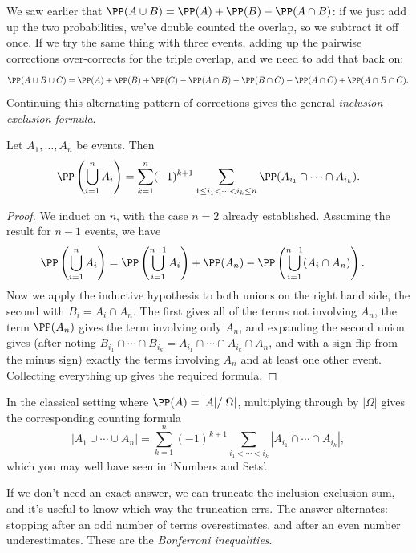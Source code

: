 We saw earlier that $\PP(A \cup B) = \PP(A) + \PP(B) - \PP(A \cap B)$: if we just add up the two probabilities, we've double counted the overlap, so we subtract it off once. If we try the same thing with three events, adding up the pairwise corrections over-corrects for the triple overlap, and we need to add that back on:
$$
\PP(A \cup B \cup C) = \PP(A) + \PP(B) + \PP(C) - \PP(A \cap B) - \PP(B \cap C) - \PP(A \cap C) + \PP(A \cap B \cap C).
$$
Continuing this alternating pattern of corrections gives the general \emph{inclusion-exclusion formula}.

\begin{theorem}
	Let $A_1, \dots, A_n$ be events. Then
	$$
	\PP\left(\bigcup_{i = 1}^{n} A_i\right) = \sum_{k = 1}^{n} (-1)^{k + 1} \sum_{1 \leq i_1 < \cdots < i_k \leq n} \PP(A_{i_1} \cap \cdots \cap A_{i_k}).
	$$
\end{theorem}
\begin{proof}
	We induct on $n$, with the case $n = 2$ already established. Assuming the result for $n - 1$ events, we have
	\begin{align*}
		\PP\left(\bigcup_{i = 1}^{n} A_i\right) &= \PP\left(\bigcup_{i = 1}^{n-1} A_i\right) + \PP(A_n) - \PP\left(\bigcup_{i = 1}^{n - 1} (A_i \cap A_n)\right).
	\end{align*}
	Now we apply the inductive hypothesis to both unions on the right hand side, the second with $B_i = A_i \cap A_n$. The first gives all of the terms not involving $A_n$, the term $\PP(A_n)$ gives the term involving only $A_n$, and expanding the second union gives (after noting $B_{i_1} \cap \cdots \cap B_{i_k} = A_{i_1} \cap \cdots \cap A_{i_k} \cap A_n$, and with a sign flip from the minus sign) exactly the terms involving $A_n$ and at least one other event. Collecting everything up gives the required formula.
\end{proof}

\begin{remark}
	In the classical setting where $\PP(A) = |A|/|\Omega|$, multiplying through by $|\Omega|$ gives the corresponding counting formula
	$$
	|A_1 \cup \cdots \cup A_n| = \sum_{k = 1}^{n} (-1)^{k + 1} \sum_{i_1 < \cdots < i_k} |A_{i_1} \cap \cdots \cap A_{i_k}|,
	$$
	which you may well have seen in `Numbers and Sets'.
\end{remark}

If we don't need an exact answer, we can truncate the inclusion-exclusion sum, and it's useful to know which way the truncation errs. The answer alternates: stopping after an odd number of terms overestimates, and after an even number underestimates. These are the \emph{Bonferroni inequalities}.

